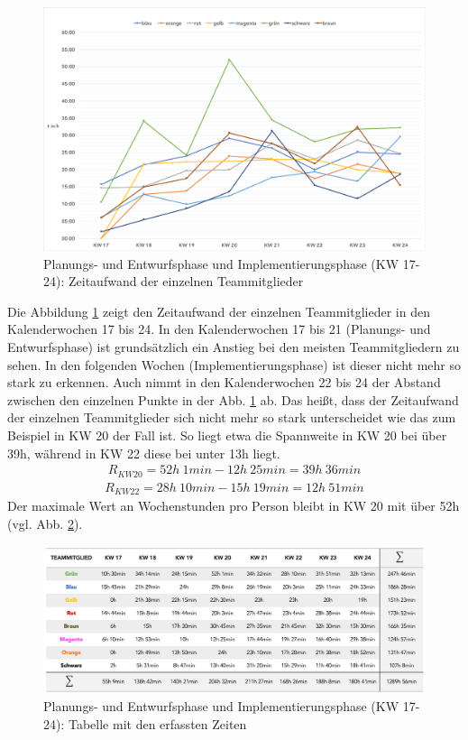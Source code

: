 \documentclass[../review_2.tex]{subfiles}
\begin{document}
\begin{figure} [h]
    \centering
    \includegraphics[width = \linewidth]{img/kimai10.pdf}
    \caption{Planungs- und Entwurfsphase und Implementierungsphase (KW 17-24): Zeitaufwand der einzelnen Teammitglieder}
    \label{kimai10}
\end{figure} 

Die Abbildung \ref{kimai10} zeigt den Zeitaufwand der einzelnen Teammitglieder in den Kalenderwochen 17 bis 24. In den Kalenderwochen 17 bis 21 (Planungs- und Entwurfsphase) ist grundsätzlich ein Anstieg bei den meisten Teammitgliedern zu sehen. In den folgenden Wochen (Implementierungsphase) ist dieser nicht mehr so stark zu erkennen. Auch nimmt in den Kalenderwochen 22 bis 24 der Abstand zwischen den einzelnen Punkte in der Abb. \ref{kimai10} ab. Das heißt, dass der Zeitaufwand der einzelnen Teammitglieder sich nicht mehr so stark unterscheidet wie das zum Beispiel in KW 20 der Fall ist. So liegt etwa die Spannweite in KW 20 bei über 39h, während in KW 22 diese bei unter 13h liegt.
\begin{align*}
    R_{KW20} = 52h\: 1min - 12h\: 25min = 39h\: 36min 
\end{align*}
\begin{align*}
   R_{KW22} = 28h\: 10min - 15h\: 19min = 12h\: 51min
\end{align*}
Der maximale Wert an Wochenstunden pro Person bleibt in KW 20 mit über 52h (vgl. Abb. \ref{kimai12}).

\begin{figure} [h]
    \centering
    \includegraphics[width = \linewidth]{img/kimai12.png}
    \caption{Planungs- und Entwurfsphase und Implementierungsphase (KW 17-24): Tabelle mit den erfassten Zeiten}
    \label{kimai12}
\end{figure} 
\end{document}
